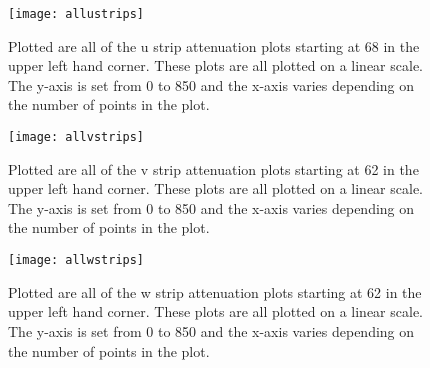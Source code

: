 \begin{figure}[h]
    \centering
    \texttt{[image: allustrips]}
    \caption{Plotted are all of the u strip attenuation plots starting at 68 in the upper left hand corner. These plots are all plotted on a linear scale. The y-axis is set from 0 to 850 and the x-axis varies depending on the number of points in the plot.}
    \label{fig:allustrips}
\end{figure}

\FloatBarrier
\begin{figure}[h]
    \centering
    \texttt{[image: allvstrips]}
    \caption{Plotted are all of the v strip attenuation plots starting at 62 in the upper left hand corner. These plots are all plotted on a linear scale. The y-axis is set from 0 to 850 and the x-axis varies depending on the number of points in the plot.}
    \label{fig:allvstrips}
\end{figure}


\FloatBarrier

\begin{figure}[h]
    \centering
    \texttt{[image: allwstrips]}
    \caption{Plotted are all of the w strip attenuation plots starting at 62 in the upper left hand corner. These plots are all plotted on a linear scale. The y-axis is set from 0 to 850 and the x-axis varies depending on the number of points in the plot.}
    \label{fig:allustrips}
\end{figure}

